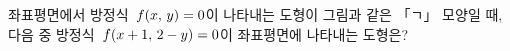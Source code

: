 \noindent\begin{minipage}[t]{0.58\linewidth}\vspace{0pt}\raggedright 좌표평면에서 방정식~$f(x,\mkern3mu y)=0$이 나타내는 도형이 그림과 같은 「ㄱ」 모양일 때, 다음 중 방정식~$f(x+1,\mkern3mu 2-y)=0$이 좌표평면에 나타내는 도형은?\end{minipage}\hfill\begin{minipage}[t]{0.4\linewidth}\vspace{0pt}\centering \resizebox{\ifdim\width>\linewidth\linewidth\else\width\fi}{!}{}\end{minipage}\par
\begin{choices32}{}{}{}{}{}\end{choices32}
